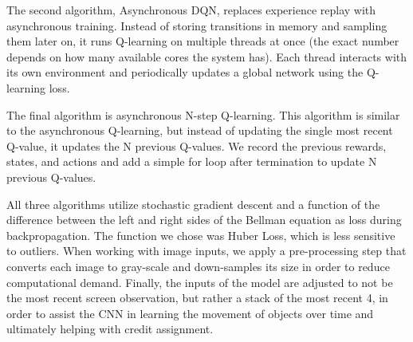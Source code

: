 \documentclass[11pt]{article}
\begin{document}
The second algorithm, Asynchronous DQN, replaces experience replay with asynchronous training. Instead of storing transitions in memory and sampling them later on, it runs Q-learning on multiple threads at once (the exact number depends on how many available cores the system has). Each thread interacts with its own environment and periodically updates a global network using the Q-learning loss.

The final algorithm is asynchronous N-step Q-learning. This algorithm is similar to the asynchronous Q-learning, but instead of updating the single most recent Q-value, it updates the N previous Q-values. We record the previous rewards, states, and actions and add a simple for loop after termination to update N previous Q-values.

All three algorithms utilize stochastic gradient descent and a function of the difference between the left and right sides of the Bellman equation as loss during backpropagation. The function we chose was Huber Loss, which is less sensitive to outliers. When working with image inputs, we apply a pre-processing step that converts each image to gray-scale and down-samples its size in order to reduce computational demand. Finally, the inputs of the model are adjusted to not be the most recent screen observation, but rather a stack of the most recent 4, in order to assist the CNN in learning the movement of objects over time and ultimately helping with credit assignment.
\end{document}
